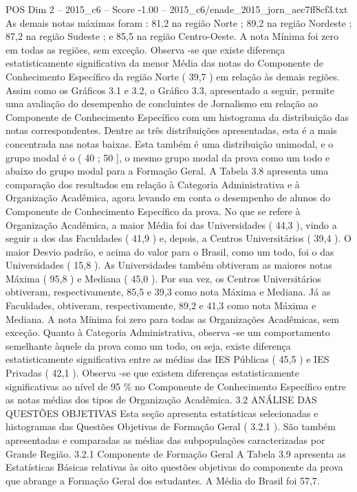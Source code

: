 \begin{textsample}{POS Dim 2 – 2015\_c6 – Score -1.00 – 2015\_c6/enade\_2015\_jorn\_aec7ff8cf3.txt}
As demais notas máximas foram : 81,2 na região Norte ; 89,2 na região Nordeste ; 87,2 na região Sudeste ; e 85,5 na região Centro-Oeste.
A nota Mínima foi zero em todas as regiões, sem exceção.
Observa -se que existe diferença estatisticamente significativa da menor Média das notas do Componente de Conhecimento Específico da região Norte ( 39,7 ) em relação às demais regiões.
Assim como os Gráficos 3.1 e 3.2, o Gráfico 3.3, apresentado a seguir, permite uma avaliação do desempenho de concluintes de Jornalismo em relação ao Componente de Conhecimento Específico com um histograma da distribuição das notas correspondentes.
Dentre as três distribuições apresentadas, esta é a mais concentrada nas notas baixas.
Esta também é uma distribuição unimodal, e o grupo modal é o ( 40 ; 50 ], o mesmo grupo modal da prova como um todo e abaixo do grupo modal para a Formação Geral.
A Tabela 3.8 apresenta uma comparação dos resultados em relação à Categoria Administrativa e à Organização Acadêmica, agora levando em conta o desempenho de alunos do Componente de Conhecimento Específico da prova.
No que se refere à Organização Acadêmica, a maior Média foi das Universidades ( 44,3 ), vindo a seguir a dos das Faculdades ( 41,9 ) e, depois, a Centros Universitários ( 39,4 ).
O maior Desvio padrão, e acima do valor para o Brasil, como um todo, foi o das Universidades ( 15,8 ).
As Universidades também obtiveram as maiores notas Máxima ( 95,8 ) e Mediana ( 45,0 ).
Por sua vez, os Centros Universitários obtiveram, respectivamente, 85,5 e 39,3 como nota Máxima e Mediana.
Já as Faculdades, obtiveram, respectivamente, 89,2 e 41,3 como nota Máxima e Mediana.
A nota Mínima foi zero para todas as Organizações Acadêmicas, sem exceção.
Quanto à Categoria Administrativa, observa -se um comportamento semelhante àquele da prova como um todo, ou seja, existe diferença estatisticamente significativa entre as médias das IES Públicas ( 45,5 ) e IES Privadas ( 42,1 ).
Observa -se que existem diferenças estatisticamente significativas ao nível de 95 \% no Componente de Conhecimento Específico entre as notas médias dos tipos de Organização Acadêmica. 3.2 ANÁLISE DAS QUESTÕES OBJETIVAS Esta seção apresenta estatísticas selecionadas e histogramas das Questões Objetivas de Formação Geral ( 3.2.1 ).
São também apresentadas e comparadas as médias das subpopulações caracterizadas por Grande Região. 3.2.1 Componente de Formação Geral A Tabela 3.9 apresenta as Estatísticas Básicas relativas às oito questões objetivas do componente da prova que abrange a Formação Geral dos estudantes.
A Média do Brasil foi 57,7.

\end{textsample}
